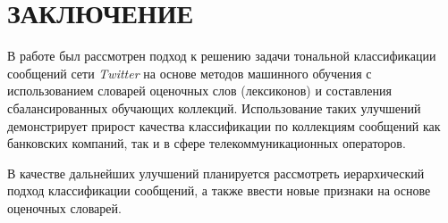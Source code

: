 \newpage
\part*{\large \centering ЗАКЛЮЧЕНИЕ}

В работе был рассмотрен подход к решению задачи тональной классификации
сообщений сети {\it Twitter} на основе методов машинного обучения с использованием
словарей оценочных слов (лексиконов) и составления сбалансированных обучающих
коллекций.
Использование таких улучшений демонстрирует прирост качества классификации
по коллекциям сообщений как банковских компаний, так и в сфере
телекоммуникационных операторов.

В качестве дальнейших улучшений планируется рассмотреть иерархический подход
классификации сообщений, а также ввести новые признаки на основе оценочных словарей.
